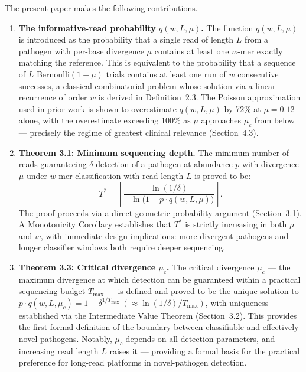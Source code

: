 \documentclass[12pt]{article}
\theoremstyle{definition}
\theoremstyle{plain}
\begin{document}
The present paper makes the following contributions.
\begin{enumerate}
  \item \textbf{The informative-read probability $q(w,L,\mu)$.} The function
  $q(w,L,\mu)$ is introduced as the probability that a single read of length
  $L$ from a pathogen with per-base divergence $\mu$ contains at least one
  $w$-mer exactly matching the reference. This is equivalent to the
  probability that a sequence of $L$ Bernoulli$(1-\mu)$ trials contains at
  least one run of $w$ consecutive successes, a classical combinatorial
  problem whose solution via a linear recurrence of order $w$ is derived in
  Definition~2.3. The Poisson approximation used in prior work is shown to
  overestimate $q(w,L,\mu)$ by 72\% at $\mu=0.12$ alone, with the
  overestimate exceeding 100\% as $\mu$ approaches $\mu_c$ from below ---
  precisely the regime of greatest clinical relevance (Section~4.3).

  \item \textbf{Theorem 3.1: Minimum sequencing depth.} The minimum number of
  reads guaranteeing $\delta$-detection of a pathogen at abundance $p$ with
  divergence $\mu$ under $w$-mer classification with read length $L$ is
  proved to be:
  \[
    T^{*} = \left\lceil \frac{\ln(1/\delta)}{-\ln\bigl(1-p\cdot q(w,L,\mu)\bigr)}\right\rceil .
  \]
  The proof proceeds via a direct geometric probability argument
  (Section~3.1). A Monotonicity Corollary establishes that $T^{*}$ is
  strictly increasing in both $\mu$ and $w$, with immediate design
  implications: more divergent pathogens and longer classifier windows both
  require deeper sequencing.

  \item \textbf{Theorem 3.3: Critical divergence $\mu_c$.} The critical
  divergence $\mu_c$ --- the maximum divergence at which detection can be
  guaranteed within a practical sequencing budget $T_{\max}$ --- is defined
  and proved to be the unique solution to
  $p\cdot q(w,L,\mu_c)=1-\delta^{1/T_{\max}}\;(\approx\ln(1/\delta)/T_{\max})$,
  with uniqueness established via the Intermediate Value Theorem
  (Section~3.2). This provides the first formal definition of the boundary
  between classifiable and effectively novel pathogens. Notably, $\mu_c$
  depends on all detection parameters, and increasing read length $L$ raises
  it --- providing a formal basis for the practical preference for long-read
  platforms in novel-pathogen detection.


\end{enumerate}
\end{document}
